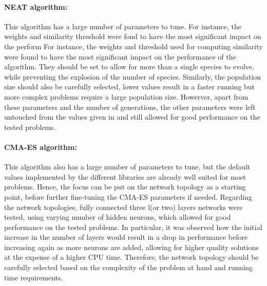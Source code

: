 \paragraph{NEAT algorithm:} This algorithm has a large number of parameters to tune. For instance, the weights and similarity threshold were fond
to have the most significant impact on the perform For instance, the weights and threshold used for computing similarity were found to have the most significant impact on the performance of the
algorithm. They should be set to allow for more than a single species to evolve, while preventing the explosion of the number of species. Similarly, the population size should also be
carefully selected, lower values result in a faster running but more complex problems require a large population size. Howerver, apart from these parameters and the number of generations,
the other parameters were left untouched from the values given in \cite{neat} and still allowed for good performance on the tested problems.

\paragraph{CMA-ES algorithm:} This algorithm also has a large number of parameters to tune, but the default values implemented by the different libraries are already well suited for most
problems. Hence, the focus can be put on the network topology as a starting point, before further fine-tuning the CMA-ES parameters if needed. Regarding the network topologies, fully
connected three l(or two) layers networks were tested, using varying number of hidden neurons, which allowed for good performance on the tested problems. In particular, it was observed how
the initial increase in the number of layers would result in a drop in performance before increasing again as more neurons are added, allowing for higher quality solutions at the expense
of a higher CPU time. Therefore, the network topology should be carefully selected based on the complexity of the problem at hand and running time requirements.
